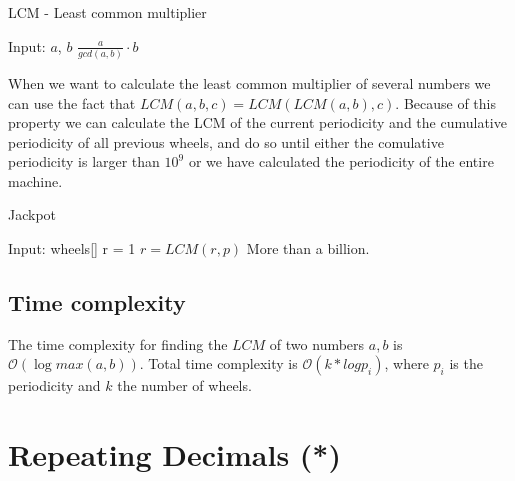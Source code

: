 \documentclass[11pt,a4paper,twoside]{article}
\begin{document}
\begin{algorithm}
    \caption{LCM - Least common multiplier}
    \label{lst:LCM}
    \begin{algorithmic}
        \REQUIRE Input: $a$, $b$
        \RETURN $ \frac{a}{gcd(a, b)} \cdot b$
    \end{algorithmic}
\end{algorithm}

When we want to calculate the least common multiplier of several numbers we can
use the fact that $LCM(a, b, c) = LCM(LCM(a, b), c)$. Because of this property
we can calculate the LCM of the current periodicity and the cumulative
periodicity of all previous wheels, and do so until either the comulative
periodicity is larger than $10^9$ or we have calculated the periodicity of the
entire machine.

\begin{algorithm}
    \caption{Jackpot}
    \label{lst:jackpot}
    \begin{algorithmic}
        \REQUIRE Input: wheels[] 
        \STATE r = 1
            \STATE $r = LCM(r, p)$
                \PRINT More than a billion.
            \ENDIF
        \ENDFOR
    \end{algorithmic}
\end{algorithm}

\subsection{Time complexity}
The time complexity for finding the $LCM$ of two numbers $a,b$ is $\mathcal{O}(\log{max(a,b)})$. Total time complexity is $\mathcal{O}(k*log{p_i})$, where $p_i$ is the periodicity and $k$ the number of wheels.

\section{Repeating Decimals (*)}
\end{document}
